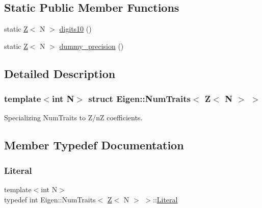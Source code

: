 \subsection*{Static Public Member Functions}
\begin{DoxyCompactItemize}
\item 
static \hyperlink{classZ}{Z}$<$ N $>$ \hyperlink{structEigen_1_1NumTraits_3_01Z_3_01N_01_4_01_4_ae5b24b565ec0c0945f74e62cb0546fad}{digits10} ()
\item 
static \hyperlink{classZ}{Z}$<$ N $>$ \hyperlink{structEigen_1_1NumTraits_3_01Z_3_01N_01_4_01_4_a75bda6fb36d6d253deba3310e9c5ed10}{dummy\+\_\+precision} ()
\end{DoxyCompactItemize}


\subsection{Detailed Description}
\subsubsection*{template$<$int N$>$\newline
struct Eigen\+::\+Num\+Traits$<$ Z$<$ N $>$ $>$}

Specializing Num\+Traits to Z/nZ coefficients. 

\subsection{Member Typedef Documentation}
\mbox{\label{structEigen_1_1NumTraits_3_01Z_3_01N_01_4_01_4_afc07a3fc65ced03bfc30de81355ac988}} 
\subsubsection{\texorpdfstring{Literal}{Literal}}
{\footnotesize\ttfamily template$<$int N$>$ \\
typedef int Eigen\+::\+Num\+Traits$<$ \hyperlink{classZ}{Z}$<$ N $>$ $>$\+::\hyperlink{structEigen_1_1NumTraits_3_01Z_3_01N_01_4_01_4_afc07a3fc65ced03bfc30de81355ac988}{Literal}}

\mbox{\label{structEigen_1_1NumTraits_3_01Z_3_01N_01_4_01_4_aadda945d9b822d2c43cddd141d895ab5}} 
